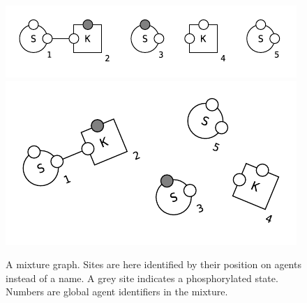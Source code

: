 \begin{figure}[!h]
  \vskip -0.25cm
  \begin{center}
    \ifshort
    \includegraphics[scale=1.0]{figures/mixture-linear.pdf}
    \else
    \includegraphics[scale=0.9]{figures/mixture.pdf}
    \fi
  \end{center}
  \vskip -0.5cm
\caption{A mixture graph. Sites are here identified by their position on
agents instead of a name. 
A grey site indicates a phosphorylated state. Numbers
are global agent identifiers in the mixture.}
  \label{fig:mixture}
\end{figure}